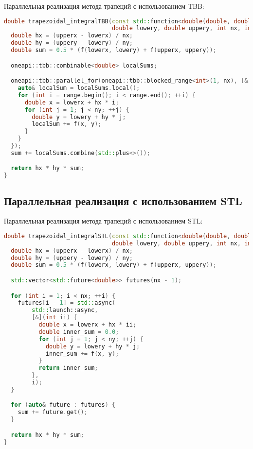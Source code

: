 \documentclass[]{article}
\theoremstyle{remark}
\theoremstyle{definition}
\begin{document}
\par Параллельная реализация метода трапеций с использованием TBB:

\begin{lstlisting}[language=C++]
double trapezoidal_integralTBB(const std::function<double(double, double)>& f, double lowerx, double upperx,
                               double lowery, double uppery, int nx, int ny) {
  double hx = (upperx - lowerx) / nx;
  double hy = (uppery - lowery) / ny;
  double sum = 0.5 * (f(lowerx, lowery) + f(upperx, uppery));

  oneapi::tbb::combinable<double> localSums;

  oneapi::tbb::parallel_for(oneapi::tbb::blocked_range<int>(1, nx), [&](const oneapi::tbb::blocked_range<int>& range) {
    auto& localSum = localSums.local();
    for (int i = range.begin(); i < range.end(); ++i) {
      double x = lowerx + hx * i;
      for (int j = 1; j < ny; ++j) {
        double y = lowery + hy * j;
        localSum += f(x, y);
      }
    }
  });
  sum += localSums.combine(std::plus<>());

  return hx * hy * sum;
}
\end{lstlisting}

\subsection{Параллельная реализация с использованием STL}

\par Параллельная реализация метода трапеций с использованием STL:

\begin{lstlisting}[language=C++]
double trapezoidal_integralSTL(const std::function<double(double, double)>& f, double lowerx, double upperx,
                               double lowery, double uppery, int nx, int ny) {
  double hx = (upperx - lowerx) / nx;
  double hy = (uppery - lowery) / ny;
  double sum = 0.5 * (f(lowerx, lowery) + f(upperx, uppery));

  std::vector<std::future<double>> futures(nx - 1);

  for (int i = 1; i < nx; ++i) {
    futures[i - 1] = std::async(
        std::launch::async,
        [&](int ii) {
          double x = lowerx + hx * ii;
          double inner_sum = 0.0;
          for (int j = 1; j < ny; ++j) {
            double y = lowery + hy * j;
            inner_sum += f(x, y);
          }
          return inner_sum;
        },
        i);
  }

  for (auto& future : futures) {
    sum += future.get();
  }

  return hx * hy * sum;
}
\end{lstlisting}
\end{document}
